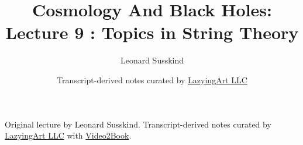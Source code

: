 \documentclass[11pt,oneside]{book}
\begin{document}
\frontmatter
\title{Cosmology And Black Holes: Lecture 9 : Topics in String Theory}
\author{Leonard Susskind}
\date{Transcript-derived notes curated by \href{https://lazying.art}{LazyingArt LLC}}
\maketitle
\begin{center}
\small Original lecture by Leonard Susskind. Transcript-derived notes curated by \href{https://lazying.art}{LazyingArt LLC} with \href{https://github.com/lachlanchen/Video2Book}{Video2Book}.
\end{center}
\clearpage
\mainmatter

\end{document}
